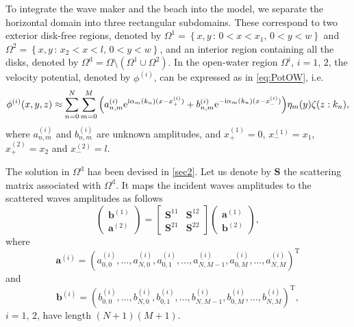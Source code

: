 \documentclass[12pt,a4paper]{article}
\def\ci{{\mathrm i}}
\renewcommand{\exp}{{\rm e}}
\newcommand{\ie}{i.e.\ }
\newcommand{\vp}{{\phi}}
\newcommand{\vm}{{\zeta}}
\newcommand{\ym}{{\eta}}
\newcommand{\kx}{\alpha}
\begin{document}
To integrate the wave maker and the beach into the model, we separate the horizontal domain into three 
rectangular subdomains. These correspond to two exterior disk-free regions, denoted by $\Omega^{1} = 
\left\{x,y\,:\,0<x<x_1,\,0<y<w\right\}$ and $\Omega^{2} = \left\{x,y\,:\,x_2<x<l,\,0<y<w\right\}$, and an 
interior region containing all the disks, denoted by $\Omega^{\mathrm{d}} = \Omega \setminus 
\left(\Omega^{1} \cup \Omega^{2}\right)$. In the open-water region $\Omega^{i}$, $i=1,\,2$, the velocity 
potential, denoted by $\vp^{(i)}$, can be expressed as in \eqref{eq:PotOW}, \ie
\begin{equation}
\vp^{(i)}(x,y,z) \approx \sum_{n=0}^{N} \sum_{m=0}^{M} 
\Big(a^{(i)}_{n,m}\exp^{\ci\kx_{m}(k_{n})(x-x^{(i)}_+)} + 
b^{(i)}_{n,m}\exp^{-\ci\kx_{m}(k_{n}) (x-x^{(i)}_-)}\Big) \ym_{m}(y) \vm(z:k_{n}),
\end{equation}
where $a^{(i)}_{n,m}$ and $b^{(i)}_{n,m}$ are unknown amplitudes, and $x^{(1)}_+=0$, $x^{(1)}_-=x_1$, 
$x^{(2)}_+=x_2$ and $x^{(2)}_-=l$.

The solution in $\Omega^{\mathrm{d}}$ has been devised in \textsection \ref{sec2}. Let us denote by 
$\mathbf{S}$ the scattering matrix associated with $\Omega^{\mathrm{d}}$. It maps the incident waves 
amplitudes to the scattered waves amplitudes as follows
\begin{equation}
	\label{eq:disk_scat}
	\left(
	\begin{array}{c}
		\mathbf{b}^{(1)} \\
		\mathbf{a}^{(2)}
	\end{array}
	\right) = \left[
	\begin{array}{cc}
	\mathbf{S}^{11} & \mathbf{S}^{12} \\
	\mathbf{S}^{21} & \mathbf{S}^{22}
	\end{array}
	\right] \left(
	\begin{array}{c}
		\mathbf{a}^{(1)} \\
		\mathbf{b}^{(2)}
	\end{array}
	\right),
\end{equation}
where 
\[
	\mathbf{a}^{(i)} = \left(a^{(i)}_{0,0},\ldots,a^{(i)}_{N,0},a^{(i)}_{0,1},\ldots,a^{(i)}_{N,M-1},
	a^{(i)}_{0,M},\ldots,a^{(i)}_{N,M}\right)^{\mathrm{T}}
\]
and 
\[
	\mathbf{b}^{(i)} = \left(b^{(i)}_{0,0},\ldots,b^{(i)}_{N,0},b^{(i)}_{0,1},\ldots,b^{(i)}_{N,M-1},
	b^{(i)}_{0,M},\ldots,b^{(i)}_{N,M}\right)^{\mathrm{T}},
\]
$i=1,\,2$, have length $(N+1)(M+1)$.
\end{document}
